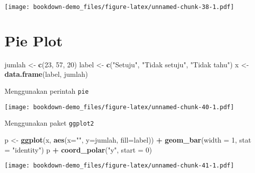 \documentclass[
]{book}
\newenvironment{Shaded}{\begin{snugshade}}{\end{snugshade}}
\newcommand{\DataTypeTok}[1]{\textcolor[rgb]{0.13,0.29,0.53}{#1}}
\newcommand{\DecValTok}[1]{\textcolor[rgb]{0.00,0.00,0.81}{#1}}
\newcommand{\KeywordTok}[1]{\textcolor[rgb]{0.13,0.29,0.53}{\textbf{#1}}}
\newcommand{\NormalTok}[1]{#1}
\newcommand{\OperatorTok}[1]{\textcolor[rgb]{0.81,0.36,0.00}{\textbf{#1}}}
\newcommand{\StringTok}[1]{\textcolor[rgb]{0.31,0.60,0.02}{#1}}
\begin{document}
\texttt{[image: bookdown-demo\_files/figure-latex/unnamed-chunk-38-1.pdf]}

\hypertarget{pie-plot}{%
\section{Pie Plot}\label{pie-plot}}

\begin{Shaded}
\begin{Highlighting}[]
\NormalTok{jumlah <-}\StringTok{ }\KeywordTok{c}\NormalTok{(}\DecValTok{23}\NormalTok{, }\DecValTok{57}\NormalTok{, }\DecValTok{20}\NormalTok{)}
\NormalTok{label <-}\StringTok{ }\KeywordTok{c}\NormalTok{(}\StringTok{"Setuju"}\NormalTok{, }\StringTok{"Tidak setuju"}\NormalTok{, }\StringTok{"Tidak tahu"}\NormalTok{)}
\NormalTok{x <-}\StringTok{ }\KeywordTok{data.frame}\NormalTok{(label, jumlah)}
\end{Highlighting}
\end{Shaded}

Menggunakan perintah \texttt{pie}

\begin{Shaded}
\end{Shaded}

\texttt{[image: bookdown-demo\_files/figure-latex/unnamed-chunk-40-1.pdf]}

Menggunakan paket \texttt{ggplot2}

\begin{Shaded}
\begin{Highlighting}[]
\NormalTok{p <-}\StringTok{ }\KeywordTok{ggplot}\NormalTok{(x, }\KeywordTok{aes}\NormalTok{(}\DataTypeTok{x=}\StringTok{""}\NormalTok{, }\DataTypeTok{y=}\NormalTok{jumlah, }\DataTypeTok{fill=}\NormalTok{label)) }\OperatorTok{+}
\StringTok{  }\KeywordTok{geom_bar}\NormalTok{(}\DataTypeTok{width =} \DecValTok{1}\NormalTok{, }\DataTypeTok{stat =} \StringTok{"identity"}\NormalTok{)}
\NormalTok{p }\OperatorTok{+}\StringTok{ }\KeywordTok{coord_polar}\NormalTok{(}\StringTok{"y"}\NormalTok{, }\DataTypeTok{start =} \DecValTok{0}\NormalTok{)}
\end{Highlighting}
\end{Shaded}

\texttt{[image: bookdown-demo\_files/figure-latex/unnamed-chunk-41-1.pdf]}
\end{document}
